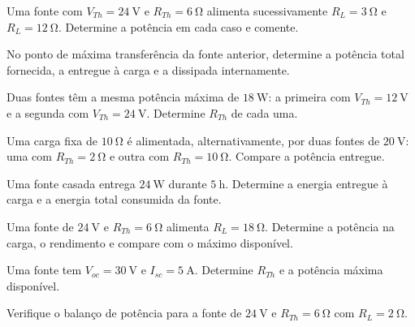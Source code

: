 \blocoaplicacao
\begin{questao}[2]{}

Uma fonte com $V_{Th}=\SI{24}{\volt}$ e $R_{Th}=\SI{6}{\ohm}$ alimenta
sucessivamente $R_L=\SI{3}{\ohm}$ e $R_L=\SI{12}{\ohm}$. Determine a potência
em cada caso e comente.


\end{questao}
\begin{questao}[2]{}

No ponto de máxima transferência da fonte anterior, determine a potência total
fornecida, a entregue à carga e a dissipada internamente.


\end{questao}
\begin{questao}[2]{}

Duas fontes têm a mesma potência máxima de $\SI{18}{\watt}$: a primeira com
$V_{Th}=\SI{12}{\volt}$ e a segunda com $V_{Th}=\SI{24}{\volt}$. Determine
$R_{Th}$ de cada uma.


\end{questao}
\begin{questao}[2]{}

Uma carga fixa de $\SI{10}{\ohm}$ é alimentada, alternativamente, por duas
fontes de $\SI{20}{\volt}$: uma com $R_{Th}=\SI{2}{\ohm}$ e outra com
$R_{Th}=\SI{10}{\ohm}$. Compare a potência entregue.


\end{questao}
\begin{questao}[2]{}

Uma fonte casada entrega $\SI{24}{\watt}$ durante $\SI{5}{\hour}$. Determine a
energia entregue à carga e a energia total consumida da fonte.


\end{questao}
\begin{questao}[2]{}

Uma fonte de $\SI{24}{\volt}$ e $R_{Th}=\SI{6}{\ohm}$ alimenta
$R_L=\SI{18}{\ohm}$. Determine a potência na carga, o rendimento e compare com
o máximo disponível.


\end{questao}
\begin{questao}[2]{}

Uma fonte tem $V_{oc}=\SI{30}{\volt}$ e $I_{sc}=\SI{5}{\ampere}$. Determine
$R_{Th}$ e a potência máxima disponível.


\end{questao}
\begin{questao}[2]{}

Verifique o balanço de potência para a fonte de $\SI{24}{\volt}$ e
$R_{Th}=\SI{6}{\ohm}$ com $R_L=\SI{2}{\ohm}$.


\end{questao}

